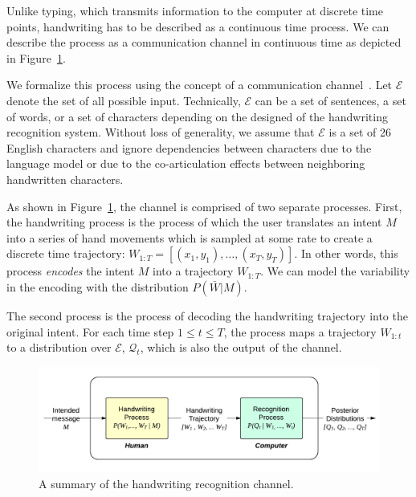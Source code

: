 \documentclass{sigchi}
\begin{document}
Unlike typing, which transmits information to the computer at discrete
time points, handwriting has to be described as a continuous time
process. We can describe the process as a communication channel in
continuous time as depicted in Figure~\ref{fig:hwr_channel}.

\newcommand{\intent}{M}
\newcommand{\intentSet}{\mathcal{E}}
\newcommand{\intentDist}{\mathcal{M}}
\newcommand{\pred}[1]{\mathcal{Q}_{#1}}
\newcommand{\predFinal}{\pred{final}}
\newcommand{\writing}[1]{W_{1:{#1}}}
\newcommand{\writingDist}{P(\bar{W} | \intent)}
\newcommand{\tFinal}{T}
\newcommand{\MI}{I(\intent ; \predFinal)}
\newcommand{\EMI}{\hat{I}(\intent ; \predFinal)}
\newcommand{\session}{\mathcal{S}}
\newcommand{\bps}{R}
\newcommand{\logloss}{\mathcal{L}}
\newcommand{\expectedDuration}{\mathbb{E} \left[\tFinal\right]}
\newcommand{\condEntropy}{H(\predFinal | \intent)}

We formalize this process using the concept of a communication
channel~\cite{Shannon1948}.  Let $\intentSet$ denote the set of all
possible input. Technically, $\intentSet$ can be a set of sentences, a
set of words, or a set of characters depending on the designed of the
handwriting recognition system. Without loss of generality, we assume
that $\intentSet$ is a set of 26 English characters and ignore
dependencies between characters due to the language model or due to
the co-articulation effects between neighboring handwritten
characters.

As shown in Figure~\ref{fig:hwr_channel}, the channel is comprised of
two separate processes. First, the handwriting process is the process
of which the user translates an intent $\intent$ into a series of hand
movements which is sampled at some rate to create a discrete time
trajectory: $\writing{T} = \left[ (x_1,y_1), \ldots, (x_T,y_T)
\right]$. In other words, this process {\em encodes} the intent
$\intent$ into a trajectory $\writing{T}$. We can model the
variability in the encoding with the distribution $\writingDist$. 

The second process is the process of decoding the handwriting trajectory
into the original intent. For each time step $1 \le t \le T$, the process
maps a trajectory $\writing{t}$ to a distribution over $\intentSet$,
$\pred{t}$, which is also the output of the channel.

\begin{figure}
  \centering
  \includegraphics[width=0.9\columnwidth]{figures/hwr_channel.pdf}
  \caption{A summary of the handwriting recognition channel.}
  \label{fig:hwr_channel}
\end{figure}
\end{document}
